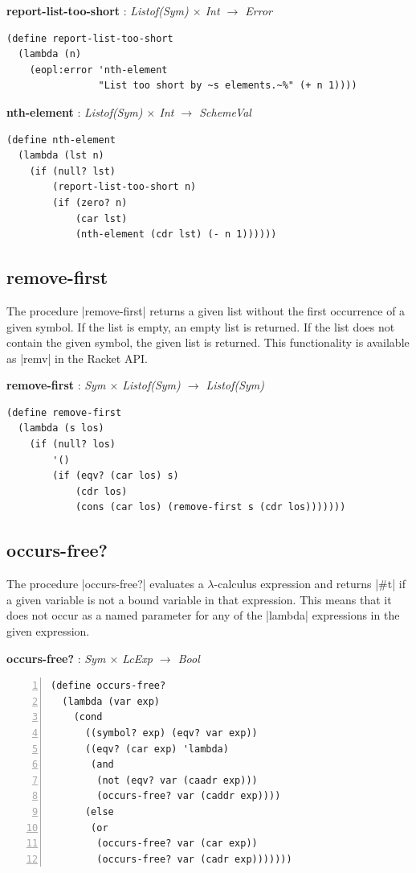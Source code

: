 \documentclass[a4paper]{article}
\begin{document}
\textbf{report-list-too-short} : \textit{Listof(Sym) $\times$ Int $\rightarrow$ Error}
\begin{lstlisting}[aboveskip=0pt]
(define report-list-too-short
  (lambda (n)
    (eopl:error 'nth-element
                "List too short by ~s elements.~%" (+ n 1))))
\end{lstlisting}

\textbf{nth-element} : \textit{Listof(Sym) $\times$ Int $\rightarrow$ SchemeVal}
\begin{lstlisting}[aboveskip=0pt]
(define nth-element
  (lambda (lst n)
    (if (null? lst)
        (report-list-too-short n)
        (if (zero? n)
            (car lst)
            (nth-element (cdr lst) (- n 1))))))
\end{lstlisting}

\subsection{remove-first}

The procedure |remove-first| returns a given list without the first occurrence of a given symbol. If the list is empty, an empty list is returned. If the list does not contain the given symbol, the given list is returned. This functionality is available as |remv| in the Racket API.

\textbf{remove-first} : \textit{Sym $\times$ Listof(Sym) $\rightarrow$ Listof(Sym)}
\begin{lstlisting}[aboveskip=0pt]
(define remove-first
  (lambda (s los)
    (if (null? los)
        '()
        (if (eqv? (car los) s)
            (cdr los)
            (cons (car los) (remove-first s (cdr los)))))))
\end{lstlisting}

\subsection{occurs-free?}

The procedure |occurs-free?| evaluates a $\lambda$-calculus expression and returns |#t| if a given variable is not a bound variable in that expression. This means that it does not occur as a named parameter for any of the |lambda| expressions in the given expression.

\textbf{occurs-free?} : \textit{Sym $\times$ LcExp $\rightarrow$ Bool}
\begin{lstlisting}[aboveskip=0pt,numbers=left]
(define occurs-free?
  (lambda (var exp)
    (cond
      ((symbol? exp) (eqv? var exp))
      ((eqv? (car exp) 'lambda)
       (and
        (not (eqv? var (caadr exp)))
        (occurs-free? var (caddr exp))))
      (else
       (or
        (occurs-free? var (car exp))
        (occurs-free? var (cadr exp)))))))
\end{lstlisting}
\end{document}
